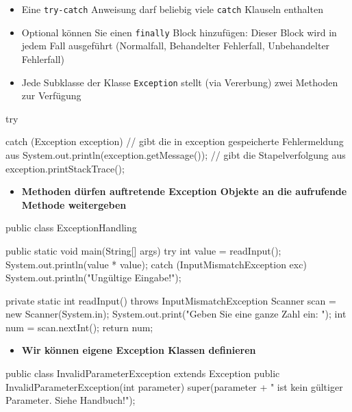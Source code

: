 \documentclass[a4paper,10pt, dvipsnames]{report}
\begin{document}
\begin{itemize}
    \item Eine \texttt{try-catch} Anweisung darf beliebig viele \texttt{catch} Klauseln enthalten
    \item Optional können Sie einen \texttt{finally} Block hinzufügen: Dieser Block wird in jedem Fall ausgeführt (Normalfall, Behandelter Fehlerfall, Unbehandelter Fehlerfall)
    \item Jede Subklasse der Klasse \texttt{Exception} stellt (via Vererbung) zwei Methoden zur Verfügung
\end{itemize}

\begin{javacodebox}
try {

}
catch (Exception exception){
	// gibt die in exception gespeicherte Fehlermeldung aus
	System.out.println(exception.getMessage());
	// gibt die Stapelverfolgung aus
	exception.printStackTrace();
}
\end{javacodebox}

\begin{itemize}
    \item \textbf{Methoden dürfen auftretende Exception Objekte an die aufrufende Methode weitergeben}
\end{itemize}

\begin{javacodebox}
public class ExceptionHandling {

    public static void main(String[] args) {
        try {
            int value = readInput();
            System.out.println(value * value);
        } catch (InputMismatchException exc) {
            System.out.println("Ungültige Eingabe!");
        }
    }

    private static int readInput() throws InputMismatchException {
        Scanner scan = new Scanner(System.in);
        System.out.print("Geben Sie eine ganze Zahl ein: ");
        int num = scan.nextInt();
        return num;
    }
}
\end{javacodebox}

\begin{itemize}
    \item \textbf{Wir können eigene Exception Klassen definieren}
\end{itemize}

\begin{javacodebox}
public class InvalidParameterException extends Exception {
    public InvalidParameterException(int parameter) {
        super(parameter + " ist kein gültiger Parameter. Siehe Handbuch!");
    }
}
\end{javacodebox}
\end{document}
